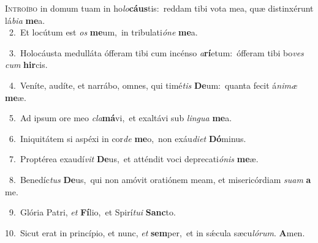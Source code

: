 \lettrine{\initial\textcolor{\initialcolor}{I}}{ntroíbo} in domum tuam in ho\-\textit{lo}\-\textbf{cáus}tis:~\star reddam tibi vota mea, quæ distinxérunt lá\-\textit{bi}\-\textit{a} \textbf{me}\-a.\\
{\numbfont\textcolor{\numbcolor}{~2.}}~Et locútum est \textit{os} \textbf{me}\-um,~\star in tribulati\-\textit{ó}\-\textit{ne} \textbf{me}\-a.\par
{\numbfont\textcolor{\numbcolor}{~3.}}~Holocáusta medulláta ófferam tibi cum incénso \textit{a}\-\textbf{rí}etum:~\star ófferam tibi bo\textit{ves} \textit{cum} \textbf{hir}\-cis.\par
{\numbfont\textcolor{\numbcolor}{~4.}}~Veníte, audíte, et narrábo, omnes, qui timé\textit{tis} \textbf{De}\-um:~\star quanta fecit á\-\textit{ni}\-\textit{mæ} \textbf{me}\-æ.\par
{\numbfont\textcolor{\numbcolor}{~5.}}~Ad ipsum ore meo \textit{cla}\-\textbf{má}vi,~\star et exaltávi sub \textit{lin}\-\textit{gua} \textbf{me}\-a.\par
{\numbfont\textcolor{\numbcolor}{~6.}}~Iniquitátem si aspéxi in cor\textit{de} \textbf{me}\-o,~\star non exáu\-\textit{di}\-\textit{et} \textbf{Dó}\-minus.\par
{\numbfont\textcolor{\numbcolor}{~7.}}~Proptérea exaudí\textit{vit} \textbf{De}\-us,~\star et atténdit voci deprecati\-\textit{ó}\-\textit{nis} \textbf{me}\-æ.\par
{\numbfont\textcolor{\numbcolor}{~8.}}~Benedíc\textit{tus} \textbf{De}\-us,~\star qui non amóvit oratiónem meam, et misericórdiam \textit{su}\-\textit{am} \textbf{a} me.\par
{\numbfont\textcolor{\numbcolor}{~9.}}~Glória Patri, \textit{et} \textbf{Fí}\-lio,~\star et Spirí\-\textit{tu}\-\textit{i} \textbf{Sanc}\-to.\par
{\numbfont\textcolor{\numbcolor}{10.}}~Sicut erat in princípio, et nunc, \textit{et} \textbf{sem}\-per,~\star et in sǽcula sæcu\-\textit{ló}\-\textit{rum}. \textbf{A}\-men.\par
